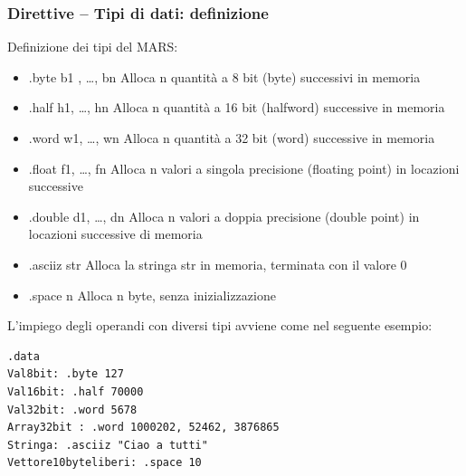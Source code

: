 \documentclass[12pt]{article} %
\begin{document}
\subsubsection{Direttive – Tipi di dati: definizione}
Definizione dei tipi del MARS:
\begin{itemize}
\item .byte b1 , …, bn Alloca n quantità a 8 bit (byte) successivi in memoria
\item .half h1, …, hn Alloca n quantità a 16 bit (halfword) successive in memoria
\item .word w1, …, wn Alloca n quantità a 32 bit (word) successive in memoria
\item .float f1, …, fn Alloca n valori a singola precisione (floating point) in locazioni successive 
\item .double d1, …, dn Alloca n valori a doppia precisione (double point) in locazioni successive di memoria
\item .asciiz str Alloca la stringa str in memoria, terminata con il valore 0
\item .space n Alloca n byte, senza inizializzazione\par\medskip\noindent 
\end{itemize}
L’impiego degli operandi con diversi tipi avviene come nel seguente esempio:
\begin{lstlisting}
.data
Val8bit: .byte 127
Val16bit: .half 70000
Val32bit: .word 5678
Array32bit : .word 1000202, 52462, 3876865
Stringa: .asciiz "Ciao a tutti"
Vettore10byteliberi: .space 10
\end{lstlisting}
\vspace{\baselineskip}
\end{document}
